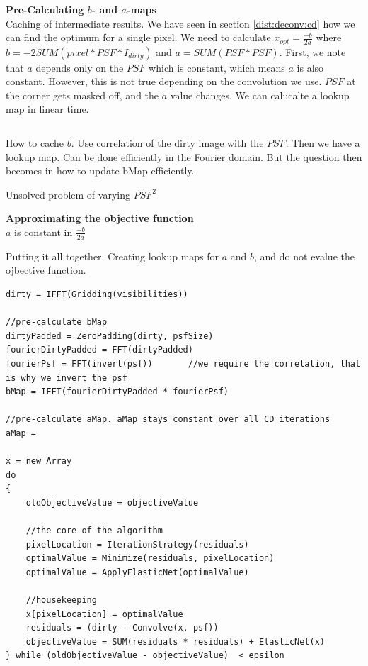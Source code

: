 \textbf{Pre-Calculating $b$- and $a$-maps}\\
Caching of intermediate results. We have seen in section \ref{dist:deconv:cd} how we can find the optimum for a single pixel. We need to calculate  $x_{opt} = \frac{-b}{2a}$ where  $b = -2 SUM( pixel*PSF*I_{dirty})$ and $a = SUM(PSF * PSF)$. First, we note that $a$ depends only on the $PSF$ which is constant, which means $a$ is also constant. However, this is not true depending on the convolution we use.
$PSF$ at the corner gets masked off, and the $a$ value changes.
We can calucalte a lookup map in linear time.
\begin{lstlisting}

\end{lstlisting}

How to cache $b$. Use correlation of the dirty image with the $PSF$. Then we have a lookup map. Can be done efficiently in the Fourier domain. But the question then becomes in how to update bMap efficiently.


Unsolved problem of varying $PSF^2$

\textbf{Approximating the objective function}\\
$a$ is constant in $\frac{-b}{2a}$



Putting it all together. Creating lookup maps for $a$ and $b$, and do not evalue the ojbective function.
\begin{lstlisting}
dirty = IFFT(Gridding(visibilities))

//pre-calculate bMap
dirtyPadded = ZeroPadding(dirty, psfSize)
fourierDirtyPadded = FFT(dirtyPadded)
fourierPsf = FFT(invert(psf))		//we require the correlation, that is why we invert the psf
bMap = IFFT(fourierDirtyPadded * fourierPsf)

//pre-calculate aMap. aMap stays constant over all CD iterations
aMap = 
 
x = new Array   
do 
{
	oldObjectiveValue = objectiveValue
	
	//the core of the algorithm
	pixelLocation = IterationStrategy(residuals)
	optimalValue = Minimize(residuals, pixelLocation)
	optimalValue = ApplyElasticNet(optimalValue)
	
	//housekeeping
	x[pixelLocation] = optimalValue
	residuals = (dirty - Convolve(x, psf))
	objectiveValue = SUM(residuals * residuals) + ElasticNet(x)
} while (oldObjectiveValue - objectiveValue)  < epsilon
\end{lstlisting}





